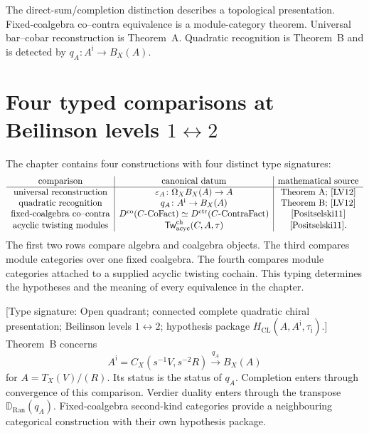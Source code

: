 \begin{remark}
\label{rem:unconditional-scope-clarification}
The direct-sum/completion distinction describes a topological
presentation.  Fixed-coalgebra co--contra equivalence is a
module-category theorem.  Universal bar--cobar reconstruction is
Theorem~A.  Quadratic recognition is Theorem~B and is detected by
\(q_A\colon A^{\mathrm i}\to B_X(A)\).
\end{remark}

\section{Four typed comparisons at Beilinson levels
\(1\leftrightarrow2\)}
\label{sec:scope-separation-thm-B}

The chapter contains four constructions with four distinct type
signatures:
\[
\begin{array}{c|c|c}
\text{comparison} & \text{canonical datum} & \text{mathematical source}\\ \hline
\text{universal reconstruction} &
 \varepsilon_A\colon\Omega_XB_X(A)\to A &
 \text{Theorem~A; \cite[Corollary~2.3.4]{LV12}}\\
\text{quadratic recognition} &
 q_A\colon A^{\mathrm i}\to B_X(A) &
 \text{Theorem~B; \cite[Theorem~3.4.6]{LV12}}\\
\text{fixed-coalgebra co--contra} &
 D^{\mathrm{co}}(C\text{-}\mathrm{CoFact})
 \simeq D^{\mathrm{ctr}}(C\text{-}\mathrm{ContraFact}) &
 \text{\cite[Theorem~5.2]{Positselski11}}\\
\text{acyclic twisting modules} &
 \mathsf{Tw}^{\mathrm{ch}}_{\mathrm{acyc}}(C,A,\tau) &
 \text{\cite[Theorem~6.5]{Positselski11}} .
\end{array}
\]
The first two rows compare algebra and coalgebra objects.  The third
compares module categories over one fixed coalgebra.  The fourth
compares module categories attached to a supplied acyclic twisting
cochain.  This typing determines the hypotheses and the meaning of
every equivalence in the chapter.

\begin{remark}
\label{rem:thm-B-scope-confusion-type}
\textup{[Type signature: Open quadrant; connected complete quadratic
chiral presentation; Beilinson levels \(1\leftrightarrow2\);
hypothesis package
\(H_{\mathrm{CL}}(A,A^{\mathrm i},\tau_{\mathrm i})\).]}
Theorem~B concerns
\[
 A^{\mathrm i}=C_X(s^{-1}V,s^{-2}R)
 \xrightarrow{\,q_A\,} B_X(A)
\]
for \(A=T_X(V)/(R)\).  Its status is the status of \(q_A\).
Completion enters through convergence of this comparison.  Verdier
duality enters through the transpose
\(\mathbb D_{\operatorname{Ran}}(q_A)\).  Fixed-coalgebra second-kind
categories provide a neighbouring categorical construction with
their own hypothesis package.
\end{remark}

